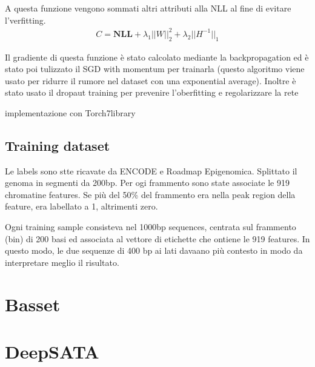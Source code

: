 A questa funzione vengono sommati altri attributi alla NLL al fine di evitare l'verfitting.
% 
\begin{gather*}
    C = \mathbf{NLL} + \lambda_1\vert\vert W \vert\vert_2^2 + \lambda_2 \vert\vert H^{-1} \vert\vert_1
\end{gather*}
% 

Il gradiente di questa funzione è stato calcolato mediante la backpropagation ed è stato poi tulizzato il SGD with momentum per trainarla (questo algoritmo viene usato per ridurre il rumore nel dataset con una exponential average). Inoltre è stato usato il dropaut training per prevenire l'oberfitting e regolarizzare la rete\,\cite{srivastava2014dropout}


implementazione con Torch7library

\subsection*{Training dataset}

Le labels sono stte ricavate da ENCODE e Roadmap Epigenomica. Splittato il genoma in segmenti da 200bp. Per ogi frammento sono state associate le 919 chromatine features. Se più del 50\% del frammento era nella peak region della feature, era labellato a 1, altrimenti zero.

Ogni training sample consisteva nel 1000bp sequences, centrata sul frammento (bin) di 200 basi ed associata al vettore di etichette che ontiene le 919 features. In questo modo, le due sequenze di 400 bp ai lati davaano più contesto in modo da interpretare meglio il risultato.



\section{Basset}

\section{DeepSATA}

